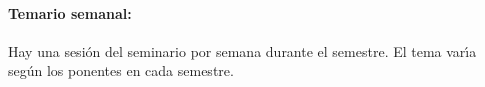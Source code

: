 \paragraph{Temario semanal:}

\quad

Hay una sesi\'{o}n del seminario por semana durante el semestre. El
tema var\'{\i}a seg\'{u}n los ponentes en cada semestre.
